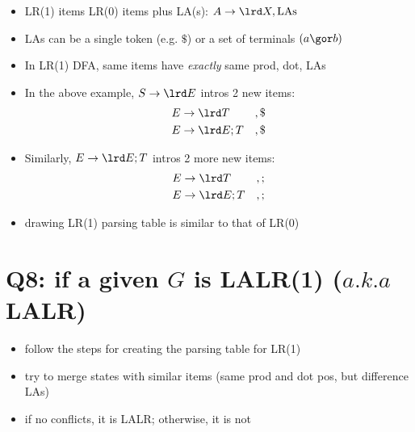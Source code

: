 \begin{itemize}
\item LR(1) items LR(0) items plus LA(s): $A\to \lrd X, \text{LAs}$
\item LAs can be a single token (e.g. $\$$) or a set of terminals $(a\gor b)$
\item In LR(1) DFA, same items have \emph{exactly} same prod, dot, LAs
\item In the above example, $S\to \lrd E$ intros 2 new items:
  \begin{align*}
    E&\to\lrd T   & &,\$\\
    E&\to\lrd E;T & &,\$
  \end{align*}
\item Similarly, $E\to \lrd E;T$ intros 2 more new items:
  \begin{align*}
    E&\to\lrd T    &  &,;\\
    E&\to\lrd E;T  &  &,;
  \end{align*}
\item drawing LR(1) parsing table is similar to that of LR(0)
\end{itemize}
\section*{Q8: if a given $G$ is LALR(1) ($a.k.a$ LALR)}
\begin{itemize}
\item follow the steps for creating the parsing table for LR(1)
\item try to merge states with similar items (same prod and dot pos, but difference LAs)
\item if no conflicts, it is LALR; otherwise, it is not
\end{itemize}
